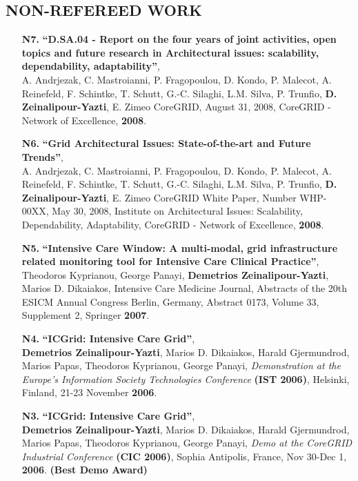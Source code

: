 \documentclass[10pt]{article}
\begin{document}
\subsection*{\bf NON-REFEREED WORK}
\begin{enumerate}

\item [{\bf N7.}]
\label{N7}
{\bf ``D.SA.04 - Report on the four years of joint activities, open topics and future research in Architectural issues: scalability, dependability, adaptability''},\\
A. Andrjezak, C. Mastroianni, P. Fragopoulou, D. Kondo, P. Malecot, A. Reinefeld, F. Schintke, T. Schutt, G.-C. Silaghi, L.M. Silva, P. Trunfio, {\bf D. Zeinalipour-Yazti}, E. Zimeo 
CoreGRID, August 31, 2008, CoreGRID - Network of Excellence, {\bf 2008}. 

\item [{\bf N6.}]
\label{N6}
{\bf ``Grid Architectural Issues: State-of-the-art and Future Trends''},\\
A. Andrjezak, C. Mastroianni, P. Fragopoulou, D. Kondo, P. Malecot, A. Reinefeld, F. Schintke, T. Schutt, G.-C. Silaghi, L.M. Silva, P. Trunfio, {\bf D. Zeinalipour-Yazti}, E. Zimeo 
CoreGRID White Paper, Number WHP-00XX, May 30, 2008, Institute on Architectural Issues: Scalability, Dependability, Adaptability, CoreGRID - Network of Excellence, {\bf 2008}.

\item [{\bf N5.}]
\label{N5}
{\bf ``Intensive Care Window: A multi-modal, grid infrastructure related monitoring tool for Intensive Care Clinical Practice''}, \\
Theodoros Kyprianou, George Panayi, {\bf Demetrios Zeinalipour-Yazti}, Marios D. Dikaiakos, 
Intensive Care Medicine Journal, Abstracts of the 20th ESICM Annual Congress Berlin, Germany, Abstract 0173,
Volume 33, Supplement 2, Springer {\bf 2007}.

\item [{\bf N4.}]
\label{N4}
{\bf ``ICGrid: Intensive Care Grid''}, \\
{\bf Demetrios Zeinalipour-Yazti}, Marios D. Dikaiakos, Harald Gjermundrod, Marios Papas, Theodoros Kyprianou, George Panayi, 
{\em  Demonstration at the Europe's Information Society Technologies Conference} {\bf (IST 2006)},  
Helsinki, Finland, 21-23 November {\bf 2006}.  

\item [{\bf N3.}]
\label{N3}
{\bf ``ICGrid: Intensive Care Grid''}, \\
{\bf Demetrios Zeinalipour-Yazti}, Marios D. Dikaiakos, Harald Gjermundrod, Marios Papas, Theodoros Kyprianou, George Panayi, 
{\em  Demo at the CoreGRID Industrial Conference} {\bf (CIC 2006)},
Sophia Antipolis, France, Nov 30-Dec 1, {\bf 2006}. {\bf (Best Demo Award)}


\end{enumerate}
\end{document}
